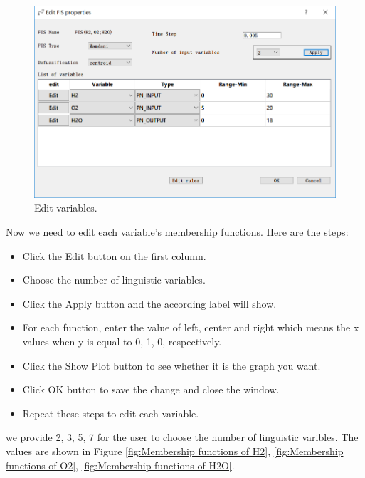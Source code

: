 \documentclass[journal,a4paper,onecolumn]{article}
\begin{document}
\begin{figure}[!hbt]
	\begin{center}
		\includegraphics[width=\columnwidth]{fig8}
		\caption{Edit variables.}
		\label{fig:Edit variables}
	\end{center}
\end{figure}

Now we need to edit each variable's membership functions. Here are the steps:
\begin{itemize}
	\item Click the Edit button on the first column.
	\item Choose the number of linguistic variables.
	\item Click the Apply button and the according label will show.
	\item For each function, enter the value of left, center and right which means the x values when y is equal to 0, 1, 0, respectively.
	\item Click the Show Plot button to see whether it is the graph you want.
	\item Click OK button to save the change and close the window.
	\item Repeat these steps to edit each variable.
\end{itemize}

we provide 2, 3, 5, 7 for the user to choose the number of linguistic varibles. The values are shown in Figure \ref{fig:Membership functions of H2}, \ref{fig:Membership functions of O2}, \ref{fig:Membership functions of H2O}.
\end{document}
